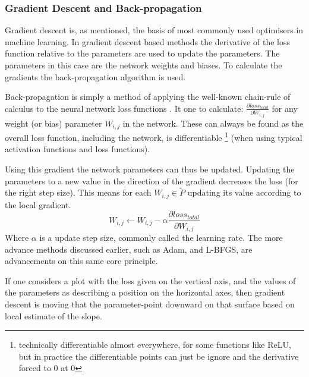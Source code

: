 \documentclass[12pt,parskip]{komatufte}\right
\begin{document}
\subsubsection{Gradient Descent and Back-propagation}


Gradient descent is, as mentioned, the basis of most commonly used optimisers in machine learning.
In gradient descent based methods the derivative of the loss function relative to the parameters are used to update the parameters.
The parameters in this case are the network weights and biases.
To calculate the gradients the back-propagation algorithm is used.

Back-propagation is simply a method of applying the well-known chain-rule of calculus to the neural network loss functions .
It one to calculate:  $\frac{\partial loss_{total}}{\partial{W_{i,j}}}$
for any weight (or bias) parameter $W_{i,j}$ in the network.
These can always be found as the overall loss function, including the network, is differentiable \footnote{technically differentiable almost everywhere, for some functions like ReLU, but in practice the differentiable points can just be ignore and the derivative forced to 0 at 0} (when using typical activation functions and loss functions).

Using this gradient the network parameters can thus be updated.
Updating the parameters to a new value in the direction of the gradient decreases the loss (for the right step size).
This means for each $W_{i,j} \in \tilde{P}$ updating its value according to the local gradient.
\begin{equation}
W_{i,j} \leftarrow W_{i,j} - \alpha \frac{\partial loss_{total}}{\partial{W_{i,j}}}
\end{equation}
Where $\alpha$ is a update step size, commonly called the learning rate.
The more advance methods discussed earlier, such as Adam, and L-BFGS, are advancements on this same core principle.


If one considers a plot with the loss given on the vertical axis,
and the values of the parameters as describing a position on the horizontal axes,
then gradient descent is moving that the parameter-point downward on that surface based on local estimate of the slope.
\end{document}
